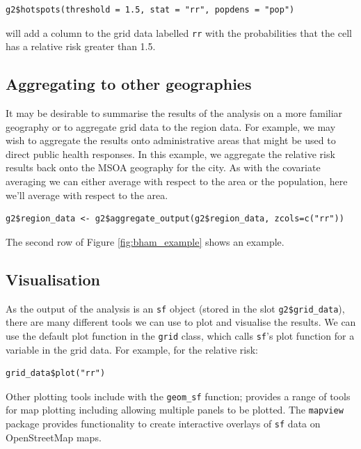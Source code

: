 \begin{lstlisting}
g2$hotspots(threshold = 1.5, stat = "rr", popdens = "pop")
\end{lstlisting}

will add a column to the grid data labelled \texttt{rr} with the probabilities that the cell has a relative risk greater than 1.5. 

\subsection{Aggregating to other geographies}
It may be desirable to summarise the results of the analysis on a more familiar geography or to aggregate grid data to the region data. For example, we may wish to aggregate the results onto administrative areas that might be used to direct public health responses. In this example, we aggregate the relative risk results back onto the MSOA geography for the city. As with the covariate averaging we can either average with respect to the area or the population, here we’ll average with respect to the area.

\begin{lstlisting}
g2$region_data <- g2$aggregate_output(g2$region_data, zcols=c("rr"))
\end{lstlisting}

The second row of Figure \ref{fig:bham_example} shows an example.

\subsection{Visualisation}
As the output of the analysis is an \texttt{sf} object (stored in the slot \texttt{g2\$grid\_data}), there are many different tools we can use to plot and visualise the results. We can use the default plot function in the \texttt{grid} class, which calls \texttt{sf}'s plot function for a variable in the grid data. For example, for the relative risk:

\begin{lstlisting}
grid_data$plot("rr")
\end{lstlisting}

Other plotting tools include  with the \texttt{geom\_sf} function;  provides a range of tools for map plotting including allowing multiple panels to be plotted. The \texttt{mapview} package provides functionality to create interactive overlays of \texttt{sf} data on OpenStreetMap maps. 

